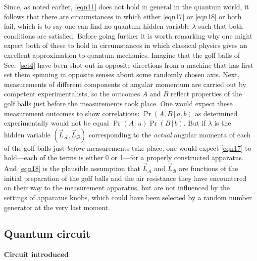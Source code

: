\documentclass[10pt]{article} %
\def\outl#1{\par{\medskip\noindent\hspace*{.5cm}\bf
      \mathversion{bold}#1\mathversion{normal}\smallskip} }
\def\np{} \def\xa{} \def\xb{} \def\xn{} \def\xp{}
\def\outl#1{} \def\np{} \def\xa{} \def\xb{} \def\xn{} \def\xp{}
\def\outl#1{\par{\medskip\noindent\hspace*{.5cm}\bf
      \mathversion{bold}#1\mathversion{normal}\smallskip} }
\def\np{\newpage }\def\xn{\nopagebreak }\def\xp{\pagebreak }
\newcommand{\vb}{\,|\,}
\newcommand{\AM}{{\mathcal A}}
\newcommand{\BM}{{\mathcal B}}
\newcommand{\lm}{\lambda }
\begin{document}
Since, as noted earlier, \eqref{eqn11} does not hold in general in the quantum
world, it follows that there are circumstances in which either \eqref{eqn17}
or \eqref{eqn18} or both fail, which is to say one can find no quantum hidden
variable $\lm$ such that both conditions are satisfied.  Before going
further it is worth remarking why one might expect both of these to hold in
circumstances in which classical physics gives an excellent approximation to
quantum mechanics.
%
Imagine that the golf balls of Sec.~\ref{sct4} have been shot out in opposite
directions from a machine that has first set them spinning in opposite
senses about some randomly chosen axis.  Next, measurements of different
components of angular momentum are carried out by competent experimentalists,
so the outcomes $A$ and $B$ reflect properties of the golf balls just before
the measurements took place.  One would expect these measurement outcomes to
show correlations: $\Pr(A,B\vb a,b)$ as determined experimentally would not be
equal $\Pr(A\vb a)\Pr(B\vb b)$.  But if $\lm$ is the hidden variable $(\vec
L_\AM,\vec L_\BM)$ corresponding to the \emph{actual} angular momenta of each
of the golf balls just \emph{before} measurements take place, one would expect
\eqref{eqn17} to hold---each of the terms is either 0 or 1---for a properly
constructed apparatus.  And \eqref{eqn18} is the plausible assumption that
$\vec L_\AM$ and $\vec L_\BM$ are functions of the initial preparation of the
golf balls and the air resistance they have encountered on their way to the
measurement apparatus, but are not influenced by the settings of apparatus
knobs, which could have been selected by a random number generator at the very
last moment.

\xb
\subsection{Quantum circuit}
\label{sct5b}
\xa

\xb
\outl{Circuit introduced}
\xa
\end{document}
